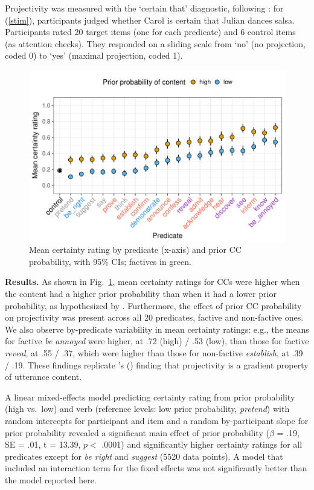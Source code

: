 \documentclass[11pt,fleqn]{article}
\newcommand{\6}{\mbox{$[\hspace*{-.6mm}[$}}
\newcommand{\9}{\mbox{$]\hspace*{-.6mm}]$}}
\newcommand{\citetpos}[1]{\citeauthor{#1}'s (\citeyear{#1})}
\begin{document}
\noindent Projectivity was measured with the `certain that' diagnostic, following \citealt{tbd-variability}: for (\ref{stim}), participants judged whether Carol is certain that Julian dances salsa. Participants rated 20 target items (one for each predicate) and 6 control items (as attention checks). They responded on a sliding scale from `no' (no projection, coded 0) to `yes' (maximal projection, coded 1).

\begin{figure}[h]
\centering
\includegraphics[width=.45\paperwidth]{../../results/3-projectivity/graphs/means-projectivity-by-predicate-and-facttype}
\caption{Mean certainty rating by predicate (x-axis) and prior CC probability, with 95\% CIs; factives in green.}\label{f-proj}
\end{figure}

\noindent
{\bf Results.} As shown in Fig.~\ref{f-proj}, mean certainty ratings for CCs were higher when the content had a higher prior probability than when it had a lower prior probability, as hypothesized by \citet{tbd-variability}. Furthermore, the effect of prior CC probability on projectivity was present across all 20 predicates, factive and non-factive ones. We also observe by-predicate variability in mean certainty ratings:  e.g., the means for factive {\em be annoyed} were higher, at .72 (high) / .53 (low), than those for factive {\em reveal}, at .55 / .37, which were higher than those for non-factive {\em establish}, at .39 / .19. These findings replicate \citetpos{tbd-variability} finding that projectivity is a gradient property of utterance content.

A linear mixed-effects model predicting certainty rating from prior probability (high vs.\ low) and verb (reference levels: low prior probability, {\em pretend}) with random intercepts for participant and item and a random by-participant slope for prior probability revealed a significant main effect of prior probability ($\beta$ = .19, SE = .01, t = 13.39, $p <$ .0001) and significantly higher certainty ratings for all predicates except for {\em be right} and {\em suggest} (5520 data points). A model that included an interaction term for the fixed effects was not significantly better than the model reported here.
\end{document}
